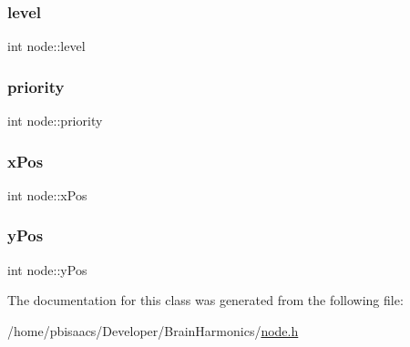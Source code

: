 \subsubsection{\texorpdfstring{level}{level}}
{\footnotesize\ttfamily int node\+::level\hspace{0.3cm}{\ttfamily [private]}}

\mbox{\label{classnode_a44e51013eb31fc1f17866ca9fe8ac75b}} 
\subsubsection{\texorpdfstring{priority}{priority}}
{\footnotesize\ttfamily int node\+::priority\hspace{0.3cm}{\ttfamily [private]}}

\mbox{\label{classnode_ac06985c464545107563b940285cb7883}} 
\subsubsection{\texorpdfstring{x\+Pos}{xPos}}
{\footnotesize\ttfamily int node\+::x\+Pos\hspace{0.3cm}{\ttfamily [private]}}

\mbox{\label{classnode_ae878a5c532b967296df247e1006adc51}} 
\subsubsection{\texorpdfstring{y\+Pos}{yPos}}
{\footnotesize\ttfamily int node\+::y\+Pos\hspace{0.3cm}{\ttfamily [private]}}



The documentation for this class was generated from the following file\+:\begin{DoxyCompactItemize}
\item 
/home/pbisaacs/\+Developer/\+Brain\+Harmonics/\mbox{\hyperlink{node_8h}{node.\+h}}\end{DoxyCompactItemize}
